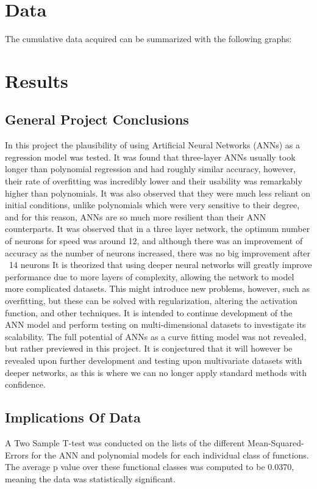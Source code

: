 \documentclass{article}
\begin{document}
\section{Data}
The cumulative data acquired can be summarized with the following graphs:

\section{Results}
\subsection{General Project Conclusions}

In this project the plausibility of using Artificial Neural Networks (ANNs) as a regression model was tested. It was found that three-layer ANNs usually took longer than polynomial regression and had roughly similar accuracy, however, their rate of overfitting was incredibly lower and their usability was remarkably higher than polynomials. It was also observed that they were much less reliant on initial conditions, unlike polynomials which were very sensitive to their degree, and for this reason, ANNs are so much more resilient than their ANN counterparts.
It was observed that in a three layer network, the optimum number of neurons for speed was around 12, and although there was an improvement of accuracy as the number of neurons increased, there was no big improvement after ~14 neurons
It is theorized that using deeper neural networks will greatly improve performance due to more layers of complexity, allowing the network to model more complicated datasets. This might introduce new problems, however, such as overfitting, but these can be solved with regularization, altering the activation function, and other techniques.
It is intended to continue development of the ANN model and perform testing on multi-dimensional datasets to investigate its scalability. The full potential of ANNs as a curve fitting model was not revealed, but rather previewed in this project. It is conjectured that it will however be revealed upon further development and testing upon multivariate datasets with deeper networks, as this is where we can no longer apply standard methods with confidence.


\subsection{Implications Of Data}

A Two Sample T-test was conducted on the lists of the different Mean-Squared-Errors for the ANN and polynomial models for each individual class of functions. The average p value over these functional classes was computed to be 0.0370, meaning the data was statistically significant.
\end{document}
